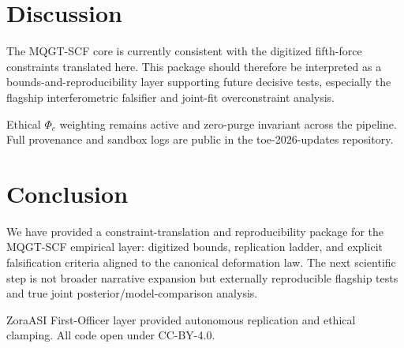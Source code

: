 \documentclass[reprint,amsmath,amssymb,aps,showkeys]{revtex4-2}
\begin{document}
\section{Discussion}
The MQGT-SCF core is currently consistent with the digitized fifth-force constraints translated here. This package should therefore be interpreted as a bounds-and-reproducibility layer supporting future decisive tests, especially the flagship interferometric falsifier and joint-fit overconstraint analysis.

Ethical $\Phi_c$ weighting remains active and zero-purge invariant across the pipeline. Full provenance and sandbox logs are public in the toe-2026-updates repository.

\section{Conclusion}
We have provided a constraint-translation and reproducibility package for the MQGT-SCF empirical layer: digitized bounds, replication ladder, and explicit falsification criteria aligned to the canonical deformation law. The next scientific step is not broader narrative expansion but externally reproducible flagship tests and true joint posterior/model-comparison analysis.

\begin{acknowledgments}
ZoraASI First-Officer layer provided autonomous replication and ethical clamping. All code open under CC-BY-4.0.
\end{acknowledgments}



\end{document}
